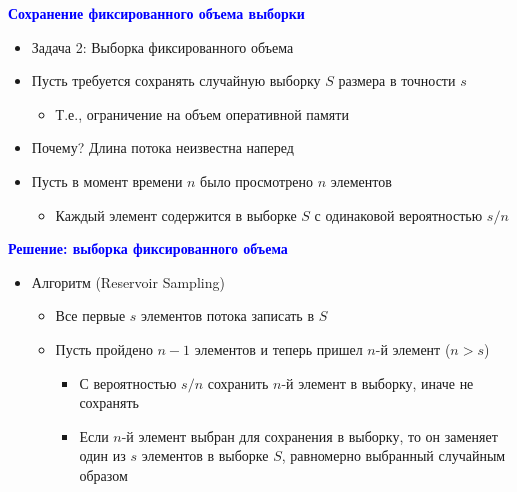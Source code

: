 \documentclass[landscape]{slides}
\begin{document}
\begin{normalsize}
\begin{slide}
\textbf{\textcolor{blue}{Сохранение фиксированного объема выборки}}

\begin{itemize}
\item Задача 2: Выборка фиксированного объема

\item Пусть требуется сохранять случайную выборку $S$ размера в точности $s$

  \begin{itemize}
  \item Т.е., ограничение на объем оперативной памяти
  \end{itemize}

\item Почему? Длина потока неизвестна наперед

\item Пусть в момент времени $n$ было просмотрено $n$ элементов

  \begin{itemize}
  \item Каждый элемент содержится в выборке $S$ с одинаковой вероятностью $s/n$
  \end{itemize}
\end{itemize}
\end{slide}


\begin{slide}
\textbf{\textcolor{blue}{Решение: выборка фиксированного объема}}

\begin{itemize}
\item Алгоритм (Reservoir Sampling)

  \begin{itemize}
  \item Все первые $s$ элементов потока записать в $S$

  \item Пусть пройдено $n-1$ элементов и теперь пришел $n$-й элемент ($n>s$)

    \begin{itemize}
    \item С вероятностью $s/n$ сохранить $n$-й элемент в выборку, иначе не сохранять

    \item Если $n$-й элемент выбран для сохранения в выборку, то он заменяет один из $s$ элементов в выборке $S$, равномерно выбранный случайным образом
    \end{itemize}
  \end{itemize}


\end{itemize}
\end{slide}
\end{normalsize}
\end{document}
